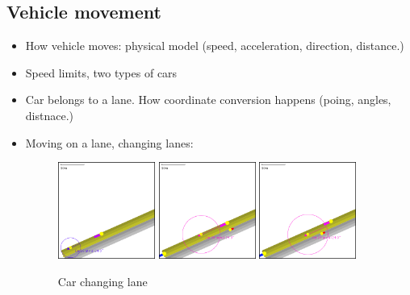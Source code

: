 \subsection{Vehicle movement}
\begin{itemize}
    \item How vehicle moves: physical model (speed, acceleration, direction, distance.)
    \item Speed limits, two types of cars
    \item Car belongs to a lane. How coordinate conversion happens (poing, angles, distnace.)
    \item Moving on a lane, changing lanes:
        \begin{figure}[!h]
            \caption{Car changing lane}
            \label{fig:carKeepingDistance}
            \centering
            \includegraphics[width=0.3\textwidth]{figs/carMovement/car_keeping_distance_to_other.png}
            \hspace{0.2em}
            \includegraphics[width=0.3\textwidth]{figs/carMovement/car_lane_change_before.png}
            \hspace{0.2em}
            \includegraphics[width=0.3\textwidth]{figs/carMovement/car_lane_change_after.png}
        \end{figure}


\end{itemize}
